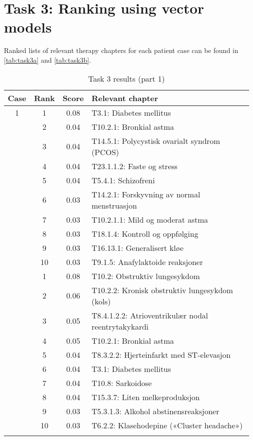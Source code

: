 \section{Task 3: Ranking using vector models}
Ranked lists of relevant therapy chapters for each patient case can be found
in \autoref{tab:task3a} and \autoref{tab:task3b}.
\begin{table}[htbp] \footnotesize \center
\caption{Task 3 results (part 1)\label{tab:task3a}}
\begin{tabular}{c c c l}
    \toprule
    Case & Rank & Score & Relevant chapter \\
    \midrule
    1 & 1 & 0.08 & T3.1: Diabetes mellitus \\
     & 2 & 0.04 & T10.2.1: Bronkial astma \\
     & 3 & 0.04 & T14.5.1: Polycystisk ovarialt syndrom (PCOS) \\
     & 4 & 0.04 & T23.1.1.2: Faste og stress \\
     & 5 & 0.04 & T5.4.1: Schizofreni \\
     & 6 & 0.03 & T14.2.1: Forskyvning av normal menstruasjon \\
     & 7 & 0.03 & T10.2.1.1: Mild og moderat astma \\
     & 8 & 0.03 & T18.1.4: Kontroll og oppfølging \\
     & 9 & 0.03 & T16.13.1: Generalisert kløe \\
     & 10 & 0.03 & T9.1.5: Anafylaktoide reaksjoner \\
	\addlinespace
    2 & 1 & 0.08 & T10.2: Obstruktiv lungesykdom \\
     & 2 & 0.06 & T10.2.2: Kronisk obstruktiv lungesykdom (kols) \\
     & 3 & 0.05 & T8.4.1.2.2: Atrioventrikulær nodal reentrytakykardi \\
     & 4 & 0.05 & T10.2.1: Bronkial astma \\
     & 5 & 0.04 & T8.3.2.2: Hjerteinfarkt med ST-elevasjon \\
     & 6 & 0.04 & T3.1: Diabetes mellitus \\
     & 7 & 0.04 & T10.8: Sarkoidose \\
     & 8 & 0.04 & T15.3.7: Liten melkeproduksjon \\
     & 9 & 0.03 & T5.3.1.3: Alkohol abstinensreaksjoner \\
     & 10 & 0.03 & T6.2.2: Klasehodepine («Cluster headache») \\
	\addlinespace

\end{tabular}
\end{table}
